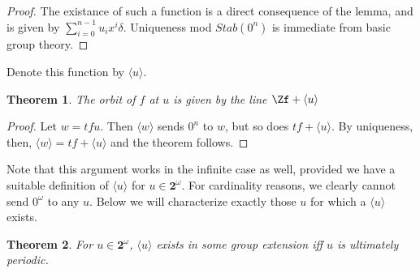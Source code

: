 \documentclass[12]{article}
\newcommand{\2}{\textbf{2}}
\newtheorem{thm}{Theorem}
\begin{document}
\begin{proof}
  The existance of such a function is a direct consequence of the lemma,
  and is given by $\sum_{i=0}^{n-1} u_i x^i \delta$.
  Uniqueness mod $Stab(0^n)$ is immediate from basic group theory.
\end{proof}

Denote this function by $\langle u \rangle$. 

\begin{thm}
  The orbit of $f$ at $u$ is given by the line $\Zf + \langle u \rangle$
\end{thm}

\begin{proof}
  Let $w = tf u$. Then $\langle w \rangle$ sends $0^n$ to $w$, 
  but so does $tf + \langle u \rangle$. By uniqueness, then,
  $\langle w \rangle = tf + \langle u \rangle$ and the theorem follows.
\end{proof}

Note that this argument works in the infinite case as well, provided 
we have a suitable definition of $\langle u \rangle$ for $u \in \2^\omega$.
For cardinality reasons, we clearly cannot send $0^\omega$ to any $u$.
Below we will characterize exactly those $u$ for which a $\langle u \rangle$
exists.

\begin{thm}
  For $u \in \2^\omega$, $\langle u \rangle$ exists in some group extension
  iff $u$ is ultimately periodic.
\end{thm}
\end{document}
